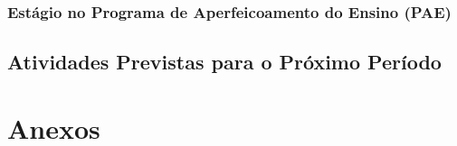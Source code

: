 \documentclass[a4paper,11pt]{article}
\begin{document}
	 	

	 \subsubsection{Estágio no Programa de Aperfeicoamento do Ensino (PAE)} %
	 \label{sub:est_gio_no_programa_de_aperfeicoamento_do_ensino_}
	 
	 	
	 
	 \subsection{Atividades Previstas para o Próximo Período} %
	 \label{sub:atividades_previstas_para_o_pr_ximo_per_odo}
	 
	 	

 

\singlespacing 




\clearpage

\section{Anexos}\label{anexos}

\label{anexos}

% 


\end{document}
